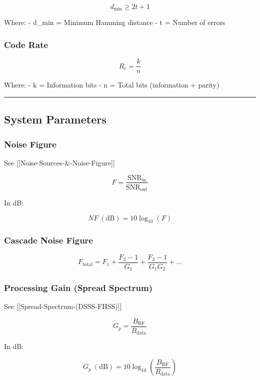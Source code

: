 \[
d_{\min} \geq 2t + 1
\]

Where: - d\_min = Minimum Hamming distance - t = Number of errors

\subsubsection{Code Rate}\label{code-rate}

\[
R_c = \frac{k}{n}
\]

Where: - k = Information bits - n = Total bits (information + parity)

\begin{center}\rule{0.5\linewidth}{0.5pt}\end{center}

\subsection{\texorpdfstring{ System
Parameters}{ System Parameters}}\label{system-parameters}

\subsubsection{Noise Figure}\label{noise-figure}

See {[}{[}Noise-Sources-\&-Noise-Figure{]}{]}

\[
F = \frac{\text{SNR}_{\text{in}}}{\text{SNR}_{\text{out}}}
\]

In dB:

\[
NF\ (\text{dB}) = 10\log_{10}(F)
\]

\subsubsection{Cascade Noise Figure}\label{cascade-noise-figure}

\[
F_{\text{total}} = F_1 + \frac{F_2 - 1}{G_1} + \frac{F_3 - 1}{G_1 G_2} + \ldots
\]

\subsubsection{Processing Gain (Spread
Spectrum)}\label{processing-gain-spread-spectrum}

See {[}{[}Spread-Spectrum-(DSSS-FHSS){]}{]}

\[
G_p = \frac{B_{\text{RF}}}{B_{\text{data}}}
\]

In dB:

\[
G_p\ (\text{dB}) = 10\log_{10}\left(\frac{B_{\text{RF}}}{B_{\text{data}}}\right)
\]

